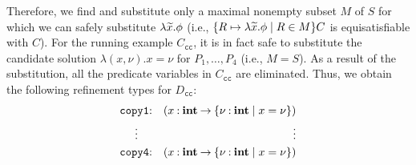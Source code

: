 Therefore, we find and substitute only a maximal nonempty subset \(M\)
of \(S\) for which we can safely substitute \(\lambda\widetilde{x}.\phi\) (i.e.,
\(\{{R \mapsto \lambda\widetilde{x}.\phi \mid R \in M}\}C\) is equisatisfiable
with \(C\)).
%
%
For the running example \(C_{\texttt{cc}}\), it is in fact safe to
substitute the candidate solution \(\lambda (x,\nu). x=\nu\) for
\(P_1,\dots,P_4\) (i.e., \(M=S\)).  As a result of the substitution, all
the predicate variables in \(C_{\texttt{cc}}\) are eliminated.  Thus, we
obtain the following refinement types for \(D_{\texttt{cc}}\):
\begin{eqnarray*}
\texttt{copy1}&\mathbin{:}&(x\mathbin{:}{\mathbf{int}}\mathbin{\rightarrow}{\{{\nu\mathbin{:}\mathbf{int} \mid x=\nu}\}}) \\
\vdots\quad &&\qquad\qquad \vdots \\
\texttt{copy4}&\mathbin{:}&(x\mathbin{:}{\mathbf{int}}\mathbin{\rightarrow}{\{{\nu\mathbin{:}\mathbf{int} \mid x=\nu}\}})
\end{eqnarray*}


%
